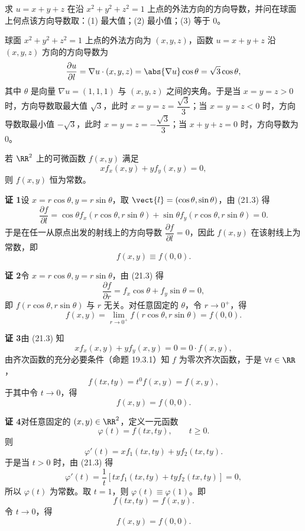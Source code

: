 \begin{xexample}[21.2.1]
求 $u=x+y+z$ 在沿 $x^2+y^2+z^2=1$ 上点的外法方向的方向导数，并问在球面上何点该方向导数取：(1) 最大值；(2) 最小值；(3) 等于 $0$。
\end{xexample}
\begin{xsolution}
球面 $x^2+y^2+z^2=1$ 上点的外法方向为 $(x,y,z)$，函数 $u=x+y+z$ 沿 $(x,y,z)$ 方向的方向导数为
\[
  \frac{\partial u}{\partial l}
  =\nabla u\cdot(x,y,z)=\abs{\nabla u}\cos\theta=\sqrt3\cos\theta,
\]
其中 $\theta$ 是向量 $\nabla u=(1,1,1)$ 与 $(x,y,z)$ 之间的夹角。于是当 $x=y=z>0$ 时，方向导数取最大值 $\sqrt3$，此时 $x=y=z=\dfrac{\sqrt3}{3}$；当 $x=y=z<0$ 时，方向导数取最小值 $-\sqrt3$，此时 $x=y=z=-\dfrac{\sqrt3}{3}$；当 $x+y+z=0$ 时，方向导数为 $0$。
\end{xsolution}

\begin{xexample}[21.2.2]
若 $\RR^2$ 上的可微函数 $f(x,y)$ 满足
\begin{equation}
  xf_x(x,y)+yf_y(x,y)=0,
  \tag{21.3}
  \label{eq:21.3}
\end{equation}
则 $f(x,y)$ 恒为常数。
\end{xexample}
\begin{xproof}
\textbf{证 1}\quad 设 $x=r\cos\theta,y=r\sin\theta$，取 $\vect{l}=(\cos\theta,\sin\theta)$，由 (21.3) 得
\[
  \frac{\partial f}{\partial l}
  =\cos\theta f_x(r\cos\theta,r\sin\theta)
  +\sin\theta f_y(r\cos\theta,r\sin\theta)=0.
\]
于是在任一从原点出发的射线上的方向导数 $\dfrac{\partial f}{\partial l}=0$，因此 $f(x,y)$ 在该射线上为常数，即
\[
  f(x,y)\equiv f(0,0).
\]

\textbf{证 2}\quad 令 $x=r\cos\theta,y=r\sin\theta$，由 (21.3) 得
\[
  \frac{\partial f}{\partial r}=f_x\cos\theta+f_y\sin\theta=0,
\]
即 $f(r\cos\theta,r\sin\theta)$ 与 $r$ 无关。对任意固定的 $\theta$，令 $r\to0^+$，得
\[
  f(x,y)=\lim_{r\to0^+}f(r\cos\theta,r\sin\theta)=f(0,0).
\]

\textbf{证 3}\quad 由 (21.3) 知
\[
  xf_x(x,y)+yf_y(x,y)=0=0\cdot f(x,y),
\]
由齐次函数的充分必要条件（命题 19.3.1）知 $f$ 为零次齐次函数，于是 $\forall t\in\RR$，
\[
  f(tx,ty)=t^0f(x,y)=f(x,y),
\]
于其中令 $t\to0$，得
\[
  f(x,y)=f(0,0).
\]

\textbf{证 4}\quad 对任意固定的 $(x,y)\in\RR^2$，定义一元函数
\[
  \varphi(t)=f(tx,ty),\qquad t\ge0.
\]
则
\[
  \varphi'(t)=xf_1(tx,ty)+yf_2(tx,ty).
\]
于是当 $t>0$ 时，由 (21.3) 得
\[
  \varphi'(t)=\frac1t[txf_1(tx,ty)+tyf_2(tx,ty)]=0,
\]
所以 $\varphi(t)$ 为常数。取 $t=1$，则 $\varphi(t)\equiv\varphi(1)$。即
\[
  f(tx,ty)=f(x,y).
\]
令 $t\to0$，得
\[
  f(x,y)=f(0,0).
\]
\end{xproof}

